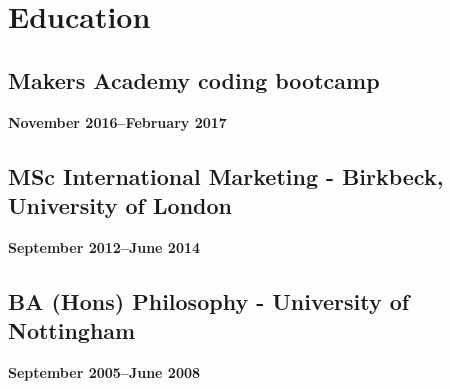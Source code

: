 \documentclass[a4paper]{scrartcl}
\begin{document}
\section*{Education}

\subsection*{Makers Academy coding bootcamp}
\textbf{November 2016--February 2017}

\subsection*{MSc International Marketing - Birkbeck, University of London}
\textbf{September 2012--June 2014}

\subsection*{BA (Hons) Philosophy - University of Nottingham}
\textbf{September 2005--June 2008}
\end{document}
